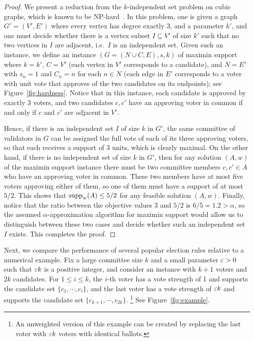 \begin{proof}
We present a reduction from the $k$-independent set problem on cubic graphs, which is known to be NP-hard~\cite{johnson1979computers}. In this problem, one is given a graph $G'=(V',E')$ where every vertex has degree exactly 3, and a parameter $k'$, and one must decide whether there is a vertex subset $I\subseteq V'$ of size $k'$ such that no two vertices in $I$ are adjacent, i.e.~$I$ is an independent set. 
Given such an instance, we define an instance $(G=(N\cup C, E), s, k)$ of maximin support where $k=k'$, $C=V'$ (each vertex in $V'$ corresponds to a candidate), and $N=E'$ with $s_n=1$ and $C_n=n$ for each $n\in N$ (each edge in $E'$ corresponds to a voter with unit vote that approves of the two candidates on its endpoints); see Figure~\ref{fig:hardness}.
Notice that in this instance, each candidate is approved by exactly 3 voters, and two candidates $c, c'$ have an approving voter in common if and only if $c$ and $c'$ are adjacent in $V'$.

Hence, if there is an independent set $I$ of size $k$ in $G'$, the same committee of validators in $G$ can be assigned the full vote of each of its three approving voters, so that each receives a support of 3 units, which is clearly maximal. On the other hand, if there is no independent set of size $k$ in $G'$, then for any solution $(A,w)$ of the maximin support instance there must be two committee members $c,c'\in A$ who have an approving voter in common. These two members have at most five voters approving either of them, so one of them must have a support of at most $5/2$. This shows that $\operatorname{supp}_w(A)\leq 5/2$ for any feasible solution $(A,w)$. Finally, notice that the ratio between the objective values $3$ and $5/2$ is $6/5=1.2>\alpha$, so the assumed $\alpha$-approximation algorithm for maximin support would allow us to distinguish between these two cases and decide whether such an independent set $I$ exists. This completes the proof.
\end{proof}

Next, we compare the performance of several popular election rules relative to a numerical example. 
Fix a large committee size $k$ and a small parameter $\varepsilon>0$ such that $\varepsilon k$ is a positive integer, and consider an instance with $k+1$ voters and $2k$ candidates. 
For $1\leq i\leq k$, the $i$-th voter has a vote strength of 1 and supports the candidate set $\{c_1, \cdots, c_i\}$, and the last voter has a vote strength of $\varepsilon k$ and supports the candidate set $\{c_{k+1}, \cdots, c_{2k}\}$.%
\footnote{An unweighted version of this example can be created by replacing the last voter with $\varepsilon k$ voters with identical ballots.} 
See Figure~\ref{fig:example}.


